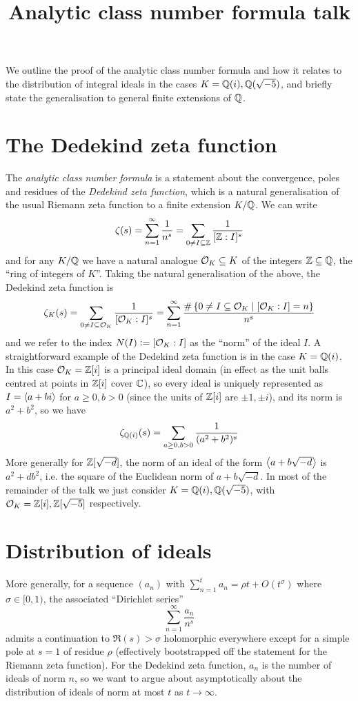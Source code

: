 \documentclass[11pt]{article}
\title{Analytic class number formula talk}
\begin{document}
\maketitle
We outline the proof of the analytic class number formula and how it relates to the distribution of integral ideals in the cases $K = \mathbb{Q}(i), \mathbb{Q}(\sqrt{-5})$, and briefly state the generalisation to general finite extensions of $\mathbb{Q}$.
\section{The Dedekind zeta function}
The \emph{analytic class number formula} is a statement about the convergence, poles and residues of the \emph{Dedekind zeta function}, which is a natural generalisation of the usual Riemann zeta function to a finite extension $K / \mathbb{Q}$. We can write
$$
    \zeta(s) = \sum_{n = 1}^\infty \frac1{n^s} = \sum_{0 \neq I \subseteq \mathbb{Z}} \frac1{[\mathbb{Z} : I]^s}
$$
and for any $K / \mathbb{Q}$ we have a natural analogue $\mathcal{O}_K \subseteq K$ of the integers $\mathbb{Z} \subseteq \mathbb{Q}$, the ``ring of integers of $K$''. Taking the natural generalisation of the above, the Dedekind zeta function is
$$
    \zeta_K(s) = \sum_{0 \neq I \subseteq \mathcal{O}_K} \frac1{[\mathcal{O}_K : I]^s} = \sum_{n = 1}^\infty \frac{\#\left\{  0 \neq I \subseteq \mathcal{O}_K \mid [\mathcal{O}_K : I] = n  \right\}}{n^s}
$$
and we refer to the index $N(I) \vcentcolon= [\mathcal{O}_K : I]$ as the ``norm'' of the ideal $I$. A straightforward example of the Dedekind zeta function is in the case $K = \mathbb{Q}(i)$. In this case $\mathcal{O}_K = \mathbb{Z}[i]$ is a principal ideal domain (in effect as the unit balls centred at points in $\mathbb{Z}[i]$ cover $\mathbb{C}$), so every ideal is uniquely represented as $I = \left\langle a + bi \right\rangle$ for $a \geq 0, b > 0$ (since the units of $\mathbb{Z}[i]$ are $\pm 1, \pm i$), and its norm is $a^2 + b^2$, so we have
$$
    \zeta_{\mathbb{Q}(i)}(s) = \sum_{a \geq 0, b > 0} \frac1{(a^2 + b^2)^s}
$$
More generally for $\mathbb{Z}[\sqrt{-d}]$, the norm of an ideal of the form $\left\langle a + b\sqrt{-d} \right\rangle$ is $a^2 + db^2$, i.e. the square of the Euclidean norm of $a + b\sqrt{-d}$. In most of the remainder of the talk we just consider $K = \mathbb{Q}(i), \mathbb{Q}(\sqrt{-5})$, with $\mathcal{O}_K = \mathbb{Z}[i], \mathbb{Z}[\sqrt{-5}]$ respectively.
\section{Distribution of ideals}
More generally, for a sequence $(a_n)$ with $\sum_{n = 1}^t a_n = \rho t + O(t^\sigma)$ where $\sigma \in [0, 1)$, the associated ``Dirichlet series''
$$
    \sum_{n = 1}^\infty \frac{a_n}{n^s}
$$
admits a continuation to $\Re(s) > \sigma$ holomorphic everywhere except for a simple pole at $s = 1$ of residue $\rho$ (effectively bootstrapped off the statement for the Riemann zeta function). For the Dedekind zeta function, $a_n$ is the number of ideals of norm $n$, so we want to argue about asymptotically about the distribution of ideals of norm at most $t$ as $t \to \infty$.
\end{document}
